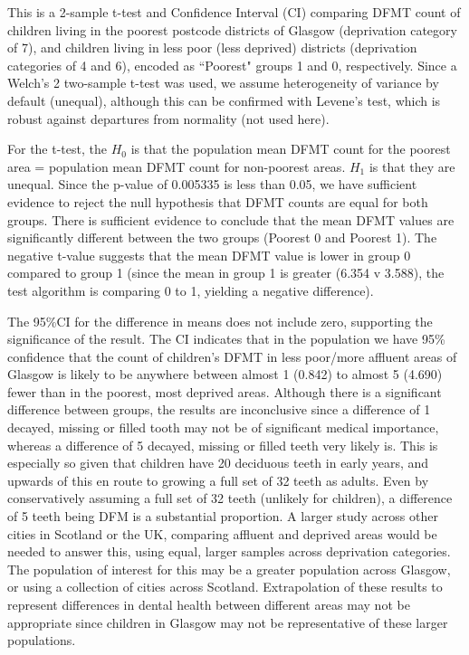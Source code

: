 \documentclass[11pt]{article}
\begin{document}
This is a 2-sample t-test and Confidence Interval (CI) comparing DFMT count of children living in the poorest postcode districts of Glasgow (deprivation category of 7), and children living in less poor (less deprived) districts (deprivation categories of 4 and 6), encoded as ``Poorest" groups 1 and 0, respectively. Since a Welch's 2 two-sample t-test was used, we assume heterogeneity of variance by default (unequal), although this can be confirmed with Levene's test, which is robust against departures from normality (not used here).

For the t-test, the $H_0$ is that the population mean DFMT count for the poorest area = population mean DFMT count for non-poorest areas. $H_1$ is that they are unequal. Since the p-value of 0.005335 is less than 0.05, we have sufficient evidence to reject the null hypothesis that DFMT counts are equal for both groups. There is sufficient evidence to conclude that the mean DFMT values are significantly different between the two groups (Poorest 0 and Poorest 1). The negative t-value suggests that the mean DFMT value is lower in group 0 compared to group 1 (since the mean in group 1 is greater (6.354 v 3.588), the test algorithm is comparing 0 to 1, yielding a negative difference). 

The 95\%CI for the difference in means does not include zero, supporting the significance of the result. The CI indicates that in the population we have 95\% confidence that the count of children's DFMT in less poor/more affluent areas of Glasgow is likely to be anywhere between almost 1 (0.842) to almost 5 (4.690) fewer than in the poorest, most deprived areas. Although there is a significant difference between groups, the results are inconclusive since a difference of 1 decayed, missing or filled tooth may not be of significant medical importance, whereas a difference of 5 decayed, missing or filled teeth very likely is. This is especially so given that children have 20 deciduous teeth in early years, and upwards of this en route to growing a full set of 32 teeth as adults. Even by conservatively assuming a full set of 32 teeth (unlikely for children), a difference of 5 teeth being DFM is a substantial proportion. A larger study across other cities in Scotland or the UK, comparing affluent and deprived areas would be needed to answer this, using equal, larger samples across deprivation categories. The population of interest for this may be a greater population across Glasgow, or using a collection of cities across Scotland. Extrapolation of these results to represent differences in dental health between different areas may not be appropriate since children in Glasgow may not be representative of these larger populations.
\end{document}
